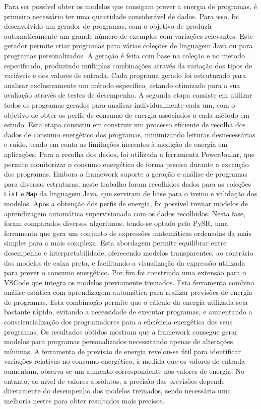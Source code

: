 Para ser possível obter os modelos que consigam prever a energia de programas, é primeiro necessário ter uma quantidade considerável de dados. Para isso, foi desenvolvido um gerador de programas, com o objetivo de produzir automaticamente um grande número de exemplos com variações relevantes.
Este gerador permite criar programas para várias coleções de linguagem Java ou para programas personalizados. A geração é feita com base na coleção e no método especificado, produzindo múltiplas combinações através da variação dos tipos de variáveis e dos valores de entrada. Cada programa gerado foi estruturado para analisar exclusivamente um método específico, estando otimizado para a sua avaliação através de testes de desempenho.
A segunda etapa consiste em utilizar todos os programas gerados para analisar individualmente cada um, com o objetivo de obter os perfis de consumo de energia associados a cada método em estudo. Esta etapa consistiu em construir um processo eficiente de recolha dos dados de consumo energético dos programas, minimizando leituras desnecessárias e ruído, tendo em conta as limitações inerentes à medição de energia em aplicações. Para a recolha dos dados, foi utilizada a ferramenta PowerJoular, que permite monitorizar o consumo energético de forma precisa durante a execução dos programas.
Embora a framework suporte a geração e análise de programas para diversas estruturas, neste trabalho foram recolhidos dados para as coleções \texttt{List} e \texttt{Map} da linguagem Java, que serviram de base para o treino e validação dos modelos.
Após a obtenção dos perfis de energia, foi possível treinar modelos de aprendizagem automática supervisionada com os dados recolhidos. Nesta fase, foram comparados diversos algoritmos, tendo-se optado pelo PySR, uma ferramenta que gera um conjunto de expressões matemáticas ordenadas da mais simples para a mais complexa. Esta abordagem permite equilibrar entre desempenho e interpretabilidade, oferecendo modelos transparentes, ao contrário dos modelos de caixa preta, e facilitando a visualização da expressão utilizada para prever o consumo energético.
Por fim foi construida uma extensão para o VSCode que integra os modelos previamente treinados. Esta ferramenta combina análise estática com aprendizagem automática para realizar previsões de energia de programas. Esta combinação permite que o cálculo da energia utilizada seja bastante rápido, evitando a necessidade de executar programas, e aumentando a consciencialização dos programadores para a eficiência energética dos seus programas.
Os resultados obtidos mostram que a framework consegue gerar modelos para programas personalizados necessitando apenas de alterações mínimas. A ferramenta de previsão de energia revelou-se útil para identificar variações relativas no consumo energético, à medida que os valores de entrada aumentam, observa-se um aumento correspondente nos valores de energia. No entanto, ao nível de valores absolutos, a precisão das previsões depende diretamente do desempenho dos modelos treinados, sendo necessária uma melhoria nestes para obter resultados mais precisos.

